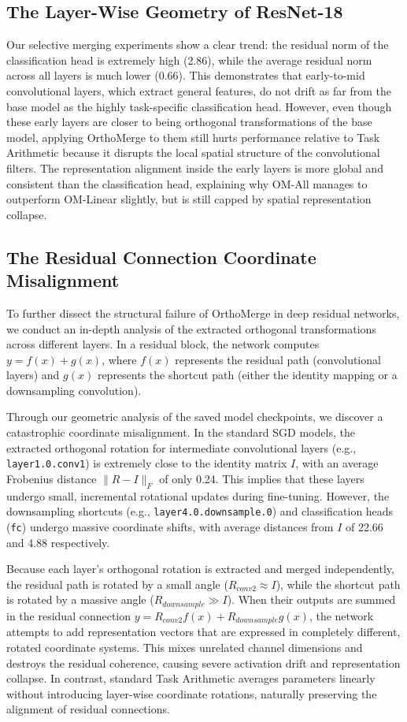 \documentclass{article}
\begin{document}
\subsection{The Layer-Wise Geometry of ResNet-18}
Our selective merging experiments show a clear trend: the residual norm of the classification head is extremely high (2.86), while the average residual norm across all layers is much lower (0.66). 
This demonstrates that early-to-mid convolutional layers, which extract general features, do not drift as far from the base model as the highly task-specific classification head. 
However, even though these early layers are closer to being orthogonal transformations of the base model, applying OrthoMerge to them still hurts performance relative to Task Arithmetic because it disrupts the local spatial structure of the convolutional filters. 
The representation alignment inside the early layers is more global and consistent than the classification head, explaining why OM-All manages to outperform OM-Linear slightly, but is still capped by spatial representation collapse.

\subsection{The Residual Connection Coordinate Misalignment}
To further dissect the structural failure of OrthoMerge in deep residual networks, we conduct an in-depth analysis of the extracted orthogonal transformations across different layers. In a residual block, the network computes $y = f(x) + g(x)$, where $f(x)$ represents the residual path (convolutional layers) and $g(x)$ represents the shortcut path (either the identity mapping or a downsampling convolution).

Through our geometric analysis of the saved model checkpoints, we discover a catastrophic coordinate misalignment. In the standard SGD models, the extracted orthogonal rotation for intermediate convolutional layers (e.g., \texttt{layer1.0.conv1}) is extremely close to the identity matrix $I$, with an average Frobenius distance $\|R - I\|_F$ of only 0.24. This implies that these layers undergo small, incremental rotational updates during fine-tuning. However, the downsampling shortcuts (e.g., \texttt{layer4.0.downsample.0}) and classification heads (\texttt{fc}) undergo massive coordinate shifts, with average distances from $I$ of 22.66 and 4.88 respectively. 

Because each layer's orthogonal rotation is extracted and merged independently, the residual path is rotated by a small angle ($R_{conv2} \approx I$), while the shortcut path is rotated by a massive angle ($R_{downsample} \gg I$). When their outputs are summed in the residual connection $y = R_{conv2} f(x) + R_{downsample} g(x)$, the network attempts to add representation vectors that are expressed in completely different, rotated coordinate systems. This mixes unrelated channel dimensions and destroys the residual coherence, causing severe activation drift and representation collapse. In contrast, standard Task Arithmetic averages parameters linearly without introducing layer-wise coordinate rotations, naturally preserving the alignment of residual connections.
\end{document}
